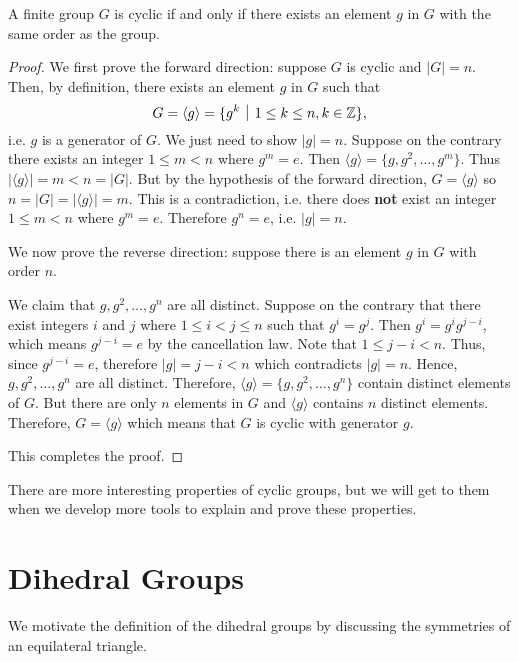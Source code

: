 \begin{theorem}\label{thrm-cyclic-group-has-element-with-same-order}
    A finite group $G$ is cyclic if and only if there exists an element $g$ in $G$ with the same order as the group.
\end{theorem}
\begin{proof}
    We first prove the forward direction: suppose $G$ is cyclic and $|G| = n$. Then, by definition, there exists an element $g$ in $G$ such that
    \[
        G = \langle g \rangle = \{g^k \vert 1 \leq k \leq n, k \in \Z\},
    \]
    i.e. $g$ is a generator of $G$. We just need to show $|g| = n$. Suppose on the contrary there exists an integer $1 \leq m < n$ where $g^m = e$. Then $\langle g \rangle = \{g, g^2, \dots, g^m\}$. Thus $|\langle g \rangle| = m < n = |G|$. But by the hypothesis of the forward direction, $G = \langle g \rangle$ so $n = |G| = |\langle g \rangle| = m$. This is a contradiction, i.e. there does \textbf{not} exist an integer $1 \leq m < n$ where $g^m = e$. Therefore $g^n = e$, i.e. $|g| = n$.

    We now prove the reverse direction: suppose there is an element $g$ in $G$ with order $n$.
    
    We claim that $g, g^2, \dots, g^n$ are all distinct. Suppose on the contrary that there exist integers $i$ and $j$ where $1 \leq i < j \leq n$ such that $g^i = g^j$. Then $g^i = g^ig^{j-i}$, which means $g^{j-i} = e$ by the cancellation law. Note that $1 \leq j - i < n$. Thus, since $g^{j-i} = e$, therefore $|g| = j - i < n$ which contradicts $|g| = n$. Hence, $g, g^2, \dots, g^n$ are all distinct. Therefore, $\langle g \rangle = \{g, g^2, \dots, g^n\}$ contain distinct elements of $G$. But there are only $n$ elements in $G$ and $\langle g \rangle$ contains $n$ distinct elements. Therefore, $G = \langle g \rangle$ which means that $G$ is cyclic with generator $g$.

    This completes the proof.
\end{proof}

There are more interesting properties of cyclic groups, but we will get to them when we develop more tools to explain and prove these properties.

\newpage

\section{Dihedral Groups}
We motivate the definition of the dihedral groups by discussing the symmetries of an equilateral triangle.

